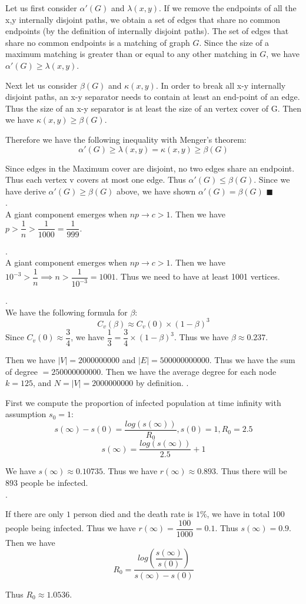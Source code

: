 \documentclass[12pt]{article}
\begin{document}
	Let us first consider $\alpha'(G)$ and $\lambda (x,y)$. If we remove the endpoints of all the x,y internally disjoint paths, we obtain a set of edges that share no common endpoints (by the definition of internally disjoint paths). The set of edges that share no common endpoints is a matching of graph $G$. Since the size of a maximum matching is greater than or equal to any other matching in $G$, we have $\alpha'(G) \geq \lambda(x,y)$.
	
	Next let us consider $\beta(G)$ and $\kappa(x,y)$. In order to break all x-y internally disjoint paths, an x-y separator needs to contain at least an end-point of an edge. Thus the size of an x-y separator is at least the size of an vertex cover of G. Then we have $\kappa(x,y) \geq \beta(G)$. 
	
	Therefore we have the following inequality with Menger's theorem:
	$$\alpha'(G) \geq \lambda(x,y) = \kappa(x,y) \geq \beta(G)$$
	
	Since edges in the Maximum cover are disjoint, no two edges share an endpoint. Thus each vertex v covers at most one edge. Thus $\alpha'(G) \leq \beta (G)$. Since we have derive $\alpha'(G) \geq \beta (G)$ above, we have shown $\alpha'(G) = \beta (G)$
	\hfill $\blacksquare$ \\

	.\\
	A giant component emerges when $np \rightarrow c > 1$. Then we have $p > \dfrac{1}{n} > \dfrac{1}{1000} = \dfrac{1}{999}$.
	
	.\\
	A giant component emerges when $np \rightarrow c > 1$. Then we have $10^{-3} > \dfrac{1}{n} \implies n > \dfrac{1}{10^{-3}} = 1001$. Thus we need to have at least 1001 vertices.
	
	.\\
	We have the following formula for $\beta$:
	$$C_v(\beta) \approx C_v(0) \times (1-\beta)^3$$
	Since $C_v(0) \approx \dfrac{3}{4}$, we have $\dfrac{1}{3} = \dfrac{3}{4} \times (1- \beta)^3$. Thus we have $\beta \approx 0.237$.
	
	Then we have $|V| = 2000000000$ and $|E| = 500000000000$. Thus we have the sum of degree $= 250000000000$. Then we have the average degree for each node $k = 125$, and $N = |V| =2000000000$ by definition. 
	.
	
	First we compute the proportion of infected population at time infinity with assumption $s_0 = 1$:\\
	$$s(\infty) - s(0) = \dfrac{log(s(\infty))}{R_0},s(0) = 1, R_0 = 2.5$$
	$$s(\infty) = \dfrac{log(s(\infty))}{2.5}+1$$
	
	We have $s(\infty) \approx 0.10735$. Thus we have $r(\infty) \approx 0.893$. Thus there will be $893$ people be infected.\\
	
	.
	
	If there are only $1$ person died and the death rate is $1\%$, we have in total $100$ people being infected. Thus we have $r(\infty) = \dfrac{100}{1000} = 0.1$. Thus $s(\infty) = 0.9$. Then we have 
	$$R_0 = \dfrac{log(\dfrac{s(\infty)}{s(0)})}{s(\infty)-s(0)}$$
	
	Thus $R_0 \approx 1.0536$.
	
\end{document}
